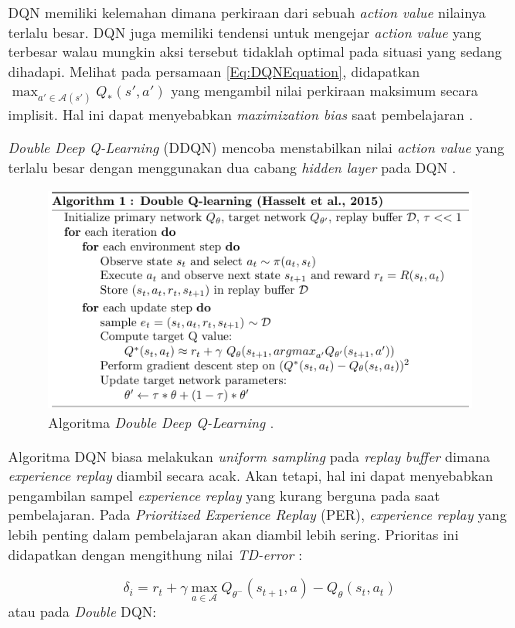 DQN memiliki kelemahan dimana perkiraan dari sebuah \emph{action value} nilainya terlalu besar.
DQN juga memiliki tendensi untuk mengejar \emph{action value} yang terbesar walau mungkin aksi tersebut tidaklah optimal pada situasi yang sedang dihadapi.
Melihat pada persamaan \ref{Eq:DQNEquation}, didapatkan $\max_{a'\in\mathcal{A}(s')}Q_*(s',a')$
yang mengambil nilai perkiraan maksimum secara implisit. Hal ini dapat menyebabkan \emph{maximization bias}
saat pembelajaran \cite{doubleQLearning}.

\emph{Double Deep Q-Learning} (DDQN) mencoba menstabilkan nilai \emph{action value} yang terlalu besar dengan menggunakan dua cabang \emph{hidden layer} pada DQN \citep{doubleDQN}.

\begin{figure}[H]
  \centering
    \includegraphics[scale=0.6]{gambar/ddqn_algorithm.png}
    \caption{Algoritma \emph{Double Deep Q-Learning} \citep{doubleDQN}.}
    \label{fig:ddqnAlgorithm}
\end{figure}

Algoritma DQN biasa melakukan \emph{uniform sampling} pada \emph{replay buffer} dimana
\emph{experience replay} diambil secara acak. Akan tetapi, hal ini dapat menyebabkan pengambilan sampel \emph{experience replay} yang kurang berguna pada saat pembelajaran.
Pada \emph{Prioritized Experience Replay} (PER), \emph{experience replay} yang lebih penting dalam
pembelajaran akan diambil lebih sering.
Prioritas ini didapatkan dengan mengithung nilai \emph{TD-error} \citep{prioritizedER}:

\begin{equation}
  \delta_{i} = r_{t} + \gamma \max_{a\in\mathcal{A}}Q_{\theta ^{-}}(s_{t+1},a) - Q_{\theta}(s_{t},a_{t})
  \label{Eq:DQNTDErrorEquation}
\end{equation}
atau pada \emph{Double} DQN:

